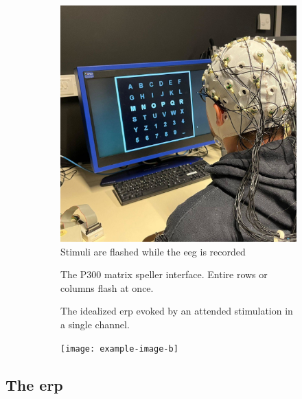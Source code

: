 \begin{figure}[t]
  \begin{subfigure}[t]{.45\textwidth}
  \includegraphics[width=\textwidth,
    height=\textwidth]{figures/bci/illustration}
    \caption{Stimuli are flashed while the \ac{eeg} is recorded}
  \end{subfigure}\hfill%
  \begin{subfigure}[t]{.45\textwidth}
    
    \caption{The P300 matrix speller interface. Entire rows or columns flash at once.}
  \end{subfigure}

  \begin{subfigure}[t]{.45\textwidth}
    
    \caption{The idealized \ac{erp} evoked by an attended stimulation in a
    single channel.}
  \end{subfigure}\hfill%
  \begin{subfigure}[t]{.45\textwidth}
    \texttt{[image: example-image-b]}
  \end{subfigure}
\end{figure}


\subsection{The \acl{erp}}%
\label{sec:bci/oddball/erp}

